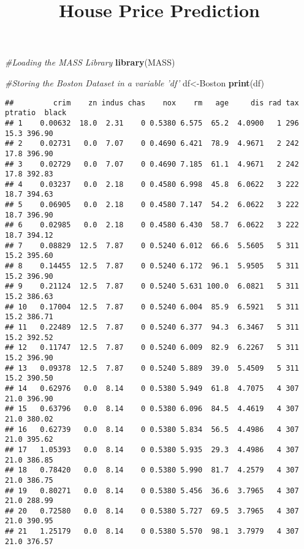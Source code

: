 \documentclass[
]{article}
\title{House Price Prediction}
\author{}
\date{\vspace{-2.5em}}
\newenvironment{Shaded}{\begin{snugshade}}{\end{snugshade}}
\newcommand{\CommentTok}[1]{\textcolor[rgb]{0.56,0.35,0.01}{\textit{#1}}}
\newcommand{\KeywordTok}[1]{\textcolor[rgb]{0.13,0.29,0.53}{\textbf{#1}}}
\newcommand{\NormalTok}[1]{#1}
\begin{document}
\maketitle

\begin{Shaded}
\begin{Highlighting}[]
\CommentTok{#Loading the MASS Library}
\KeywordTok{library}\NormalTok{(MASS)}

\CommentTok{#Storing the Boston Dataset in a variable 'df'}
\NormalTok{df<-Boston}
\KeywordTok{print}\NormalTok{(df)}
\end{Highlighting}
\end{Shaded}

\begin{verbatim}
##         crim    zn indus chas    nox    rm   age     dis rad tax ptratio  black
## 1    0.00632  18.0  2.31    0 0.5380 6.575  65.2  4.0900   1 296    15.3 396.90
## 2    0.02731   0.0  7.07    0 0.4690 6.421  78.9  4.9671   2 242    17.8 396.90
## 3    0.02729   0.0  7.07    0 0.4690 7.185  61.1  4.9671   2 242    17.8 392.83
## 4    0.03237   0.0  2.18    0 0.4580 6.998  45.8  6.0622   3 222    18.7 394.63
## 5    0.06905   0.0  2.18    0 0.4580 7.147  54.2  6.0622   3 222    18.7 396.90
## 6    0.02985   0.0  2.18    0 0.4580 6.430  58.7  6.0622   3 222    18.7 394.12
## 7    0.08829  12.5  7.87    0 0.5240 6.012  66.6  5.5605   5 311    15.2 395.60
## 8    0.14455  12.5  7.87    0 0.5240 6.172  96.1  5.9505   5 311    15.2 396.90
## 9    0.21124  12.5  7.87    0 0.5240 5.631 100.0  6.0821   5 311    15.2 386.63
## 10   0.17004  12.5  7.87    0 0.5240 6.004  85.9  6.5921   5 311    15.2 386.71
## 11   0.22489  12.5  7.87    0 0.5240 6.377  94.3  6.3467   5 311    15.2 392.52
## 12   0.11747  12.5  7.87    0 0.5240 6.009  82.9  6.2267   5 311    15.2 396.90
## 13   0.09378  12.5  7.87    0 0.5240 5.889  39.0  5.4509   5 311    15.2 390.50
## 14   0.62976   0.0  8.14    0 0.5380 5.949  61.8  4.7075   4 307    21.0 396.90
## 15   0.63796   0.0  8.14    0 0.5380 6.096  84.5  4.4619   4 307    21.0 380.02
## 16   0.62739   0.0  8.14    0 0.5380 5.834  56.5  4.4986   4 307    21.0 395.62
## 17   1.05393   0.0  8.14    0 0.5380 5.935  29.3  4.4986   4 307    21.0 386.85
## 18   0.78420   0.0  8.14    0 0.5380 5.990  81.7  4.2579   4 307    21.0 386.75
## 19   0.80271   0.0  8.14    0 0.5380 5.456  36.6  3.7965   4 307    21.0 288.99
## 20   0.72580   0.0  8.14    0 0.5380 5.727  69.5  3.7965   4 307    21.0 390.95
## 21   1.25179   0.0  8.14    0 0.5380 5.570  98.1  3.7979   4 307    21.0 376.57

\end{verbatim}
\end{document}
